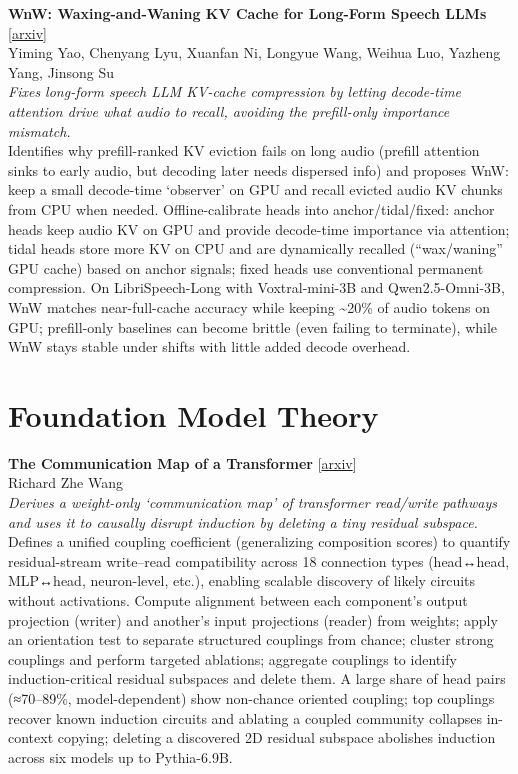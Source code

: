 \documentclass[12pt,letterpaper]{article}
\begin{document}
\medskip

{\small\textbf{WnW: Waxing-and-Waning KV Cache for Long-Form Speech LLMs}} {\scriptsize[\href{https://arxiv.org/abs/2608.22704}{arxiv}]}\\
{\scriptsize Yiming Yao, Chenyang Lyu, Xuanfan Ni, Longyue Wang, Weihua Luo, Yazheng Yang, Jinsong Su}\\

{\small\textit{Fixes long-form speech LLM KV-cache compression by letting decode-time attention drive what audio to recall, avoiding the prefill-only importance mismatch.}}\\[1pt]
{\footnotesize Identifies why prefill-ranked KV eviction fails on long audio (prefill attention sinks to early audio, but decoding later needs dispersed info) and proposes WnW: keep a small decode-time `observer' on GPU and recall evicted audio KV chunks from CPU when needed. Offline-calibrate heads into anchor/tidal/fixed: anchor heads keep audio KV on GPU and provide decode-time importance via attention; tidal heads store more KV on CPU and are dynamically recalled (``wax/waning'' GPU cache) based on anchor signals; fixed heads use conventional permanent compression. On LibriSpeech-Long with Voxtral-mini-3B and Qwen2.5-Omni-3B, WnW matches near-full-cache accuracy while keeping \textasciitilde{}20\% of audio tokens on GPU; prefill-only baselines can become brittle (even failing to terminate), while WnW stays stable under shifts with little added decode overhead.}

\medskip


\section*{Foundation Model Theory}

{\small\textbf{The Communication Map of a Transformer}} {\scriptsize[\href{https://arxiv.org/abs/2608.22007}{arxiv}]}\\
{\scriptsize Richard Zhe Wang}\\

{\small\textit{Derives a weight-only `communication map' of transformer read/write pathways and uses it to causally disrupt induction by deleting a tiny residual subspace.}}\\[1pt]
{\footnotesize Defines a unified coupling coefficient (generalizing composition scores) to quantify residual-stream write--read compatibility across 18 connection types (head↔head, MLP↔head, neuron-level, etc.), enabling scalable discovery of likely circuits without activations. Compute alignment between each component's output projection (writer) and another's input projections (reader) from weights; apply an orientation test to separate structured couplings from chance; cluster strong couplings and perform targeted ablations; aggregate couplings to identify induction-critical residual subspaces and delete them. A large share of head pairs (≈70--89\%, model-dependent) show non-chance oriented coupling; top couplings recover known induction circuits and ablating a coupled community collapses in-context copying; deleting a discovered 2D residual subspace abolishes induction across six models up to Pythia-6.9B.}
\end{document}

